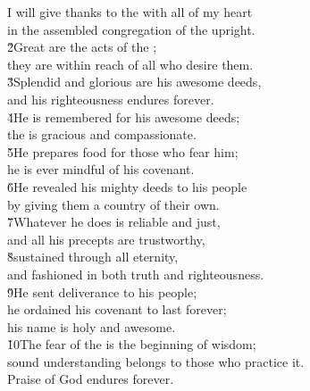 \begin{poetry}
\poeml I will give thanks to the  with all of my heart \\
\poemll    in the assembled congregation of the upright. \\
\poeml \v{2}Great are the acts of the ; \\
\poemll    they are within reach of all who desire them. \\
\poeml \v{3}Splendid and glorious are his awesome deeds, \\
\poemll    and his righteousness endures forever. \\
\poeml \v{4}He is remembered for his awesome deeds; \\
\poemll    the  is gracious and compassionate. \\
\poeml \v{5}He prepares food for those who fear him; \\
\poemll    he is ever mindful of his covenant. \\
\poeml \v{6}He revealed his mighty deeds to his people \\
\poemll    by giving them a country of their own. \\
\poeml \v{7}Whatever he does is reliable and just, \\
\poemll    and all his precepts are trustworthy, \\
\poeml \v{8}sustained through all eternity, \\
\poemll    and fashioned in both truth and righteousness. \\
\poeml \v{9}He sent deliverance to his people; \\
\poemll    he ordained his covenant to last forever; \\
\poemlll       his name is holy and awesome. \\
\poeml \v{10}The fear of the  is the beginning of wisdom; \\
\poemll    sound understanding belongs to those who practice it. \\
\poeml Praise of God endures forever.
\end{poetry}

